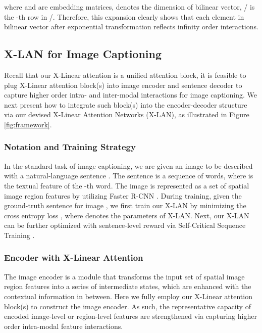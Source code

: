 \documentclass[10pt,twocolumn,letterpaper]{article}
\begin{document}
where  and  are embedding matrices,  denotes the dimension of bilinear vector, / is the -th row in /. Therefore, this expansion clearly shows that each element in bilinear vector after exponential transformation reflects infinity order interactions.

\subsection{X-LAN for Image Captioning}
Recall that our X-Linear attention is a unified attention block, it is feasible to plug X-Linear attention block(s) into image encoder and sentence decoder to capture higher order intra- and inter-modal interactions for image captioning. We next present how to integrate such block(s) into the encoder-decoder structure via our devised X-Linear Attention Networks (X-LAN), as illustrated in Figure \ref{fig:framework}.

\subsubsection{Notation and Training Strategy}
In the standard task of image captioning, we are given an image  to be described with a natural-language sentence . The sentence  is a sequence of  words, where  is the textual feature of the -th word. The image  is represented as a set of spatial image region features  by utilizing Faster R-CNN \cite{ren2015faster}. During training, given the ground-truth sentence  for image , we first train our X-LAN by minimizing the cross entropy loss , where  denotes the parameters of X-LAN. Next, our X-LAN can be further optimized with sentence-level reward via Self-Critical Sequence Training \cite{rennie2017self}.

\subsubsection{Encoder with X-Linear Attention}
The image encoder is a module that transforms the input set of spatial image region features  into a series of intermediate states, which are enhanced with the contextual information in between. Here we fully employ our X-Linear attention block(s) to construct the image encoder. As such, the representative capacity of encoded image-level or region-level features are strengthened via capturing higher order intra-modal feature interactions.
\end{document}
